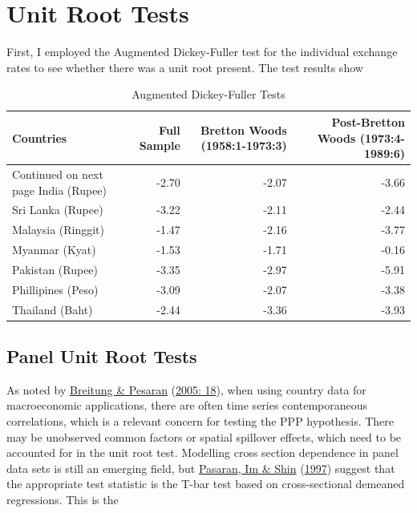 \documentclass[11pt,preprint, authoryear]{elsarticle}
\numberwithin{equation}{section}
\numberwithin{figure}{section}
\numberwithin{table}{section}
\begin{document}
\hypertarget{unit-root-tests}{%
\section{\texorpdfstring{Unit Root Tests
\label{Unit}}{Unit Root Tests }}\label{unit-root-tests}}

First, I employed the Augmented Dickey-Fuller test for the individual
exchange rates to see whether there was a unit root present. The test
results show

\begingroup\fontsize{11pt}{12pt}\selectfont
\begin{longtable}{lrrr}
\caption{Augmented Dickey-Fuller Tests} \\ 
  \toprule
Countries & Full Sample & Bretton Woods (1958:1-1973:3) & Post-Bretton Woods (1973:4-1989:6) \\ 
  \hline 
\endhead 
\hline 
{\footnotesize Continued on next page} 
\endfoot 
\endlastfoot 
 \midrule
India (Rupee) & -2.70 & -2.07 & -3.66 \\ 
  Sri Lanka (Rupee) & -3.22 & -2.11 & -2.44 \\ 
  Malaysia (Ringgit) & -1.47 & -2.16 & -3.77 \\ 
  Myanmar (Kyat) & -1.53 & -1.71 & -0.16 \\ 
  Pakistan (Rupee) & -3.35 & -2.97 & -5.91 \\ 
  Phillipines (Peso) & -3.09 & -2.07 & -3.38 \\ 
  Thailand (Baht) & -2.44 & -3.36 & -3.93 \\ 
   \bottomrule
\end{longtable}
\endgroup

\hypertarget{panel-unit-root-tests}{%
\subsection{Panel Unit Root Tests}\label{panel-unit-root-tests}}

As noted by \protect\hyperlink{ref-pes}{Breitung \& Pesaran}
(\protect\hyperlink{ref-pes}{2005: 18}), when using country data for
macroeconomic applications, there are often time series contemporaneous
correlations, which is a relevant concern for testing the PPP
hypothesis. There may be unobserved common factors or spatial spillover
effects, which need to be accounted for in the unit root test. Modelling
cross section dependence in panel data sets is still an emerging field,
but \protect\hyperlink{ref-im}{Pasaran, Im \& Shin}
(\protect\hyperlink{ref-im}{1997}) suggest that the appropriate test
statistic is the T-bar test based on cross-sectional demeaned
regressions. This is the
\end{document}
